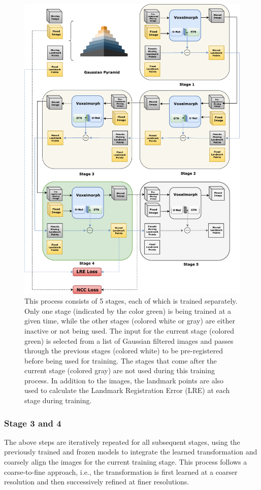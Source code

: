 \documentclass{book}
\begin{document}
	\begin{figure}[p!]
		\centering
		\includegraphics[width=\columnwidth]{resources/chapter4/methods/Method4.pdf}
		\caption{This process consists of 5 stages, each of which is trained separately. Only one stage (indicated by the color green) is being trained at a given time, while the other stages (colored white or gray) are either inactive or not being used. The input for the current stage (colored green) is selected from a list of Gaussian filtered images and passes through the previous stages (colored white) to be pre-registered before being used for training. The stages that come after the current stage (colored gray) are not used during this training process. In addition to the images, the landmark points are also used to calculate the Landmark Registration Error (LRE) at each stage during training.}
		\label{fig:block_method4}
	\end{figure}
	
	\subsubsection{Stage 3 and 4}
	The above steps are iteratively repeated for all subsequent stages, using the previously trained and frozen models to integrate the learned transformation and coarsely align the images for the current training stage. This process follows a coarse-to-fine approach, i.e., the transformation is first learned at a coarser resolution and then successively refined at finer resolutions.
	
\end{document}
